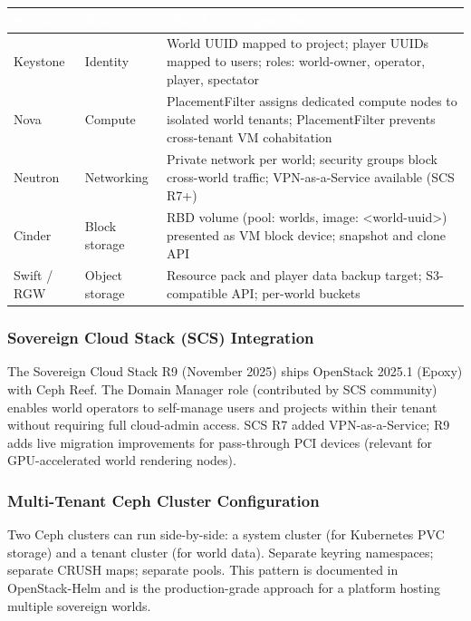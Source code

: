 \documentclass[11pt,letterpaper]{article}
\newcommand{\tableheader}[1]{\textbf{\sffamily\textcolor{white}{#1}}}
\begin{document}
\begin{center}
\begin{tabularx}{\textwidth}{L{3cm}L{3cm}X}
\toprule
{}
\tableheader{Service} & \tableheader{Role} & \tableheader{World Sovereignty Function} \\
\midrule
Keystone & Identity & World UUID mapped to project; player UUIDs mapped to users; roles: world-owner, operator, player, spectator \\
Nova & Compute & PlacementFilter assigns dedicated compute nodes to isolated world tenants; PlacementFilter prevents cross-tenant VM cohabitation \\
Neutron & Networking & Private network per world; security groups block cross-world traffic; VPN-as-a-Service available (SCS R7+) \\
Cinder & Block storage & RBD volume (pool: worlds, image: <world-uuid>) presented as VM block device; snapshot and clone API \\
Swift / RGW & Object storage & Resource pack and player data backup target; S3-compatible API; per-world buckets \\
\bottomrule
\end{tabularx}
\end{center}

\subsubsection{Sovereign Cloud Stack (SCS) Integration}

The Sovereign Cloud Stack R9 (November 2025) ships OpenStack 2025.1 (Epoxy) with Ceph Reef. The Domain Manager role (contributed by SCS community) enables world operators to self-manage users and projects within their tenant without requiring full cloud-admin access. SCS R7 added VPN-as-a-Service; R9 adds live migration improvements for pass-through PCI devices (relevant for GPU-accelerated world rendering nodes).

\subsubsection{Multi-Tenant Ceph Cluster Configuration}

Two Ceph clusters can run side-by-side: a system cluster (for Kubernetes PVC storage) and a tenant cluster (for world data). Separate keyring namespaces; separate CRUSH maps; separate pools. This pattern is documented in OpenStack-Helm and is the production-grade approach for a platform hosting multiple sovereign worlds.
\end{document}
